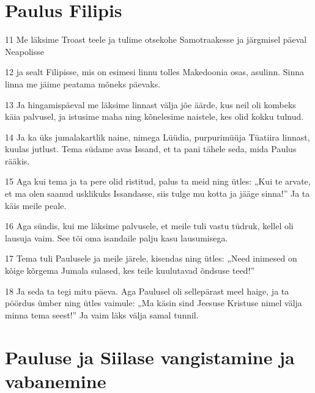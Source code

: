 \section*{Paulus Filipis}

\par 11 Me läksime Troast teele ja tulime otsekohe Samotraakesse ja järgmisel päeval Neapolisse
\par 12 ja sealt Filipisse, mis on esimesi linnu tolles Makedoonia osas, asulinn. Sinna linna me jäime peatama mõneks päevaks.
\par 13 Ja hingamispäeval me läksime linnast välja jõe äärde, kus neil oli kombeks käia palvusel, ja istusime maha ning kõnelesime naistele, kes olid kokku tulnud.
\par 14 Ja ka üks jumalakartlik naine, nimega Lüüdia, purpurimüüja Tüatiira linnast, kuulas jutlust. Tema südame avas Issand, et ta pani tähele seda, mida Paulus rääkis.
\par 15 Aga kui tema ja ta pere olid ristitud, palus ta meid ning ütles: „Kui te arvate, et ma olen saanud usklikuks Issandasse, siis tulge mu kotta ja jääge sinna!” Ja ta käis meile peale.
\par 16 Aga sündis, kui me läksime palvusele, et meile tuli vastu tüdruk, kellel oli lausuja vaim. See tõi oma isandaile palju kasu lausumisega.
\par 17 Tema tuli Paulusele ja meile järele, kisendas ning ütles: „Need inimesed on kõige kõrgema Jumala sulased, kes teile kuulutavad õndsuse teed!”
\par 18 Ja seda ta tegi mitu päeva. Aga Paulusel oli sellepärast meel haige, ja ta pöördus ümber ning ütles vaimule: „Ma käsin sind Jeesuse Kristuse nimel välja minna tema seest!” Ja vaim läks välja samal tunnil.

\section*{Pauluse ja Siilase vangistamine ja vabanemine}

